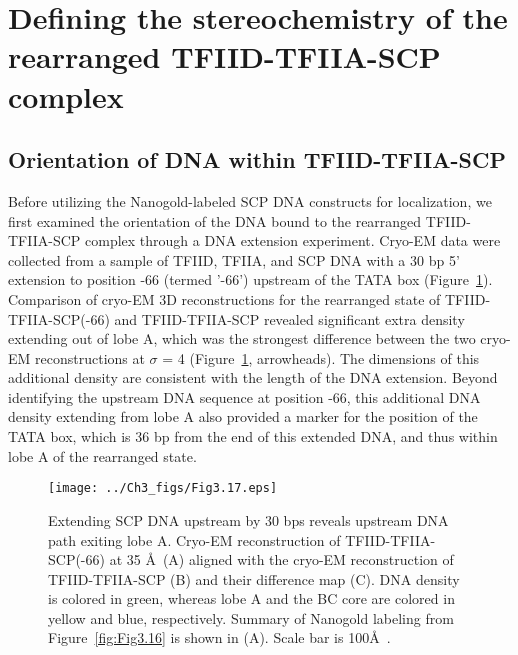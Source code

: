 \section{Defining the stereochemistry of the rearranged TFIID-TFIIA-SCP complex}

\subsection{Orientation of DNA within TFIID-TFIIA-SCP}
Before utilizing the Nanogold-labeled SCP DNA constructs for localization, we first examined the orientation of the DNA bound to the rearranged TFIID-TFIIA-SCP complex through a DNA extension experiment. Cryo-EM data were collected from a sample of TFIID, TFIIA, and SCP DNA with a 30 bp 5' extension to position -66 (termed '-66') upstream of the TATA box (Figure~\ref{fig:Fig3.17}). Comparison of cryo-EM 3D reconstructions for the rearranged state of TFIID-TFIIA-SCP(-66) and TFIID-TFIIA-SCP revealed significant extra density extending out of lobe A, which was the strongest difference between the two cryo-EM reconstructions at $\sigma$ = 4 (Figure~\ref{fig:Fig3.17}, arrowheads). The dimensions of this additional density are consistent with the length of the DNA extension. Beyond identifying the upstream DNA sequence at position -66, this additional DNA density extending from lobe A also provided a marker for the position of the TATA box, which is 36 bp from the end of this extended DNA, and thus within lobe A of the rearranged state.\\
\begin{figure}
\centering
\texttt{[image: ../Ch3\_figs/Fig3.17.eps]}
\caption[Extending SCP DNA upstream by 30 bps reveals upstream DNA path exiting lobe A]{Extending SCP DNA upstream by 30 bps reveals upstream DNA path exiting lobe A. Cryo-EM reconstruction of TFIID-TFIIA-SCP(-66) at 35 \AA\ (A) aligned with the cryo-EM reconstruction of TFIID-TFIIA-SCP (B) and their difference map (C). DNA density is colored in green, whereas lobe A and the BC core are colored in yellow and blue, respectively. Summary of Nanogold labeling from Figure~\ref{fig:Fig3.16} is shown in (A). Scale bar is 100\AA\ . }
\label{fig:Fig3.17}
\end{figure}
